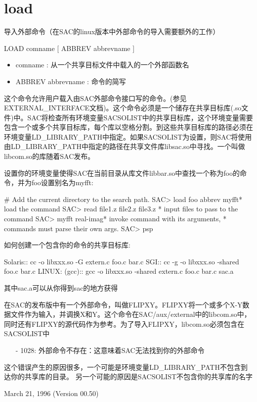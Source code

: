 \section{load}
\label{cmd:load}

导入外部命令（在SAC的linux版本中外部命令的导入需要额外的工作）

LOAD comname [ ABBREV abbrevname ]

\begin{itemize}
\item comname : 从一个共享目标文件中载入的一个外部函数名 
\item ABBREV abbrevname : 命令的简写 
\end{itemize}

这个命令允许用户载入由SAC外部命令接口写的命令。(参见EXTERNAL\_INTERFACE文档)。这个命令必须是一个储存在共享目标库(.so文件)中。SAC将检查所有环境变量SACSOLIST中的共享目标库，这个环境变量需要包含一个或多个共享目标库，每个库以空格分割。到这些共享目标库的路径必须在环境变量LD\_LIBRARY\_PATH中指定。如果SACSOLIST为设置，则SAC将使用由LD\_LIBRARY\_PATH中指定的路径在共享文件库libsac.so中寻找。一个叫做libcom.so的库随着SAC发布。

设置你的环境变量使得SAC在当前目录从库文件libbar.so中查找一个称为foo的命令，并为foo设置别名为myfft:
\begin{SACCode}
#  Add the current directory to the search path.
SAC> load foo abbrev myfft* load the command
SAC> read file1.z file2.z file3.z  * input files to pass to the command
SAC> myfft real-imag* invoke command with its arguments,
* commands must parse their own args.
SAC> psp
\end{SACCode}

如何创建一个包含你的命令的共享目标库:
\begin{SACCode}
Solaris::
cc -o libxxx.so -G extern.c foo.c bar.c
SGI::
cc -g -o libxxx.so -shared foo.c bar.c
LINUX: (gcc)::
gcc -o libxxx.so -shared extern.c foo.c bar.c sac.a
\end{SACCode}
其中sac.a可以从你得到sac的地方获得

在SAC的发布版中有一个外部命令，叫做FLIPXY。FLIPXY将一个或多个X-Y数据文件作为输入，并调换X和Y。这个命令在SAC/aux/external中的libcom.so中，同时还有FLIPXY的源代码作为参考。为了导入FLIPXY，libcom.so必须包含在SACSOLIST中

\begin{itemize}
\item[-]1028: 外部命令不存在：这意味着SAC无法找到你的外部命令
\end{itemize}

这个错误产生的原因很多，一个可能是环境变量LD\_LIBRARY\_PATH不包含到达你的共享库的目录。
另一个可能的原因是SACSOLIST不包含你的共享库的名字

March 21, 1996 (Version 00.50)

